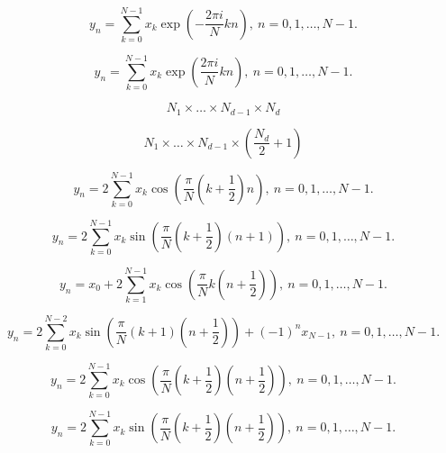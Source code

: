 \documentclass[12pt,a4paper]{article}
\begin{document}
$$
y_n = \sum_{k=0}^{N-1}x_k\exp(-\frac{2\pi i}{N}kn),
\ n=0,1,\dots,N\!\!-\!\!1.
$$
\newpage

$$
y_n = \sum_{k=0}^{N-1}x_k\exp(\frac{2\pi i}{N}kn),
\ n=0,1,\dots,N\!\!-\!\!1.
$$
\newpage

$$
N_1 \times \dots \times N_{d-1} \times N_d
$$
\newpage

$$
N_1 \times \dots \times N_{d-1} \times (\frac{N_d}{2}+1)
$$
\newpage

$$
y_n = 2\sum_{k=0}^{N-1}x_k\cos(\frac{\pi}{N}(k+\frac{1}{2})n),
\ n=0,1,\dots,N\!\!-\!\!1.
$$
\newpage

$$
y_n = 2\sum_{k=0}^{N-1}x_k\sin(\frac{\pi}{N}(k+\frac{1}{2})(n+1)),
\ n=0,1,\dots,N\!\!-\!\!1.
$$
\newpage

$$
y_n = x_0 + 2\sum_{k=1}^{N-1}x_k\cos(\frac{\pi}{N}k(n+\frac{1}{2})),
\ n=0,1,\dots,N\!\!-\!\!1.
$$
\newpage

$$
y_n = 2\sum_{k=0}^{N-2}x_k\sin(\frac{\pi}{N}(k+1)(n+\frac{1}{2}))+(-1)^{n}x_{N-1},
\ n=0,1,\dots,N\!\!-\!\!1.
$$
\newpage

$$
y_n = 2\sum_{k=0}^{N-1}x_k\cos(\frac{\pi}{N}(k+\frac{1}{2})(n+\frac{1}{2})),
\ n=0,1,\dots,N\!\!-\!\!1.
$$
\newpage

$$
y_n = 2\sum_{k=0}^{N-1}x_k\sin(\frac{\pi}{N}(k+\frac{1}{2})(n+\frac{1}{2})),
\ n=0,1,\dots,N\!\!-\!\!1.
$$
\end{document}
